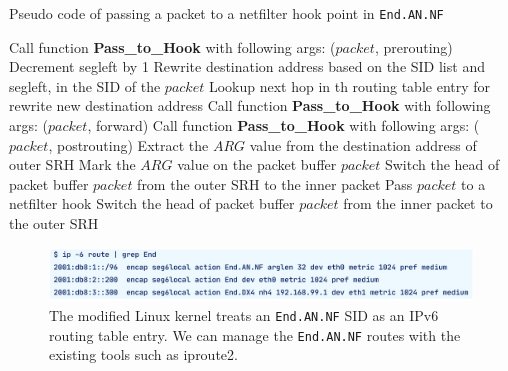   \begin{algorithm*}[t]
    \caption{Pseudo code of passing a packet to a netfilter hook point in \texttt{End.AN.NF}}
    \small
    \label{alg:end-an-nf}
    \begin{algorithmic}[1]
      \State Call function \textbf{Pass\_to\_Hook} with following args: ($packet$, prerouting)
      \State Decrement segleft by 1
      \State Rewrite destination address based on the SID list and segleft, in the SID of the $packet$
      \State Lookup next hop in th routing table entry for rewrite new destination address
      \State Call function \textbf{Pass\_to\_Hook} with following args: ($packet$, forward)
      \State Call function \textbf{Pass\_to\_Hook} with following args: ($packet$, postrouting)
      \EndFunction
      \fi
      \State Extract the $ARG$ value from the destination address of outer SRH
      \State Mark the $ARG$ value on the packet buffer $packet$
      \EndIf
      \State Switch the head of packet buffer $packet$ from the outer SRH to the inner packet
      \State Pass $packet$ to a netfilter hook
      \State Switch the head of packet buffer $packet$ from the inner packet to the outer SRH
      \EndFunction
    \end{algorithmic}
  \end{algorithm*}
  
  \begin{figure}[t]
    \centering
    \includegraphics[width=0.95\linewidth]{img/End-FW-show-route.pdf}
    \caption{The modified Linux kernel treats an \texttt{End.AN.NF} SID as an IPv6 routing table entry. We can manage the \texttt{End.AN.NF} routes with the existing tools such as iproute2.}
    \label{fig:show-route}
  \end{figure}